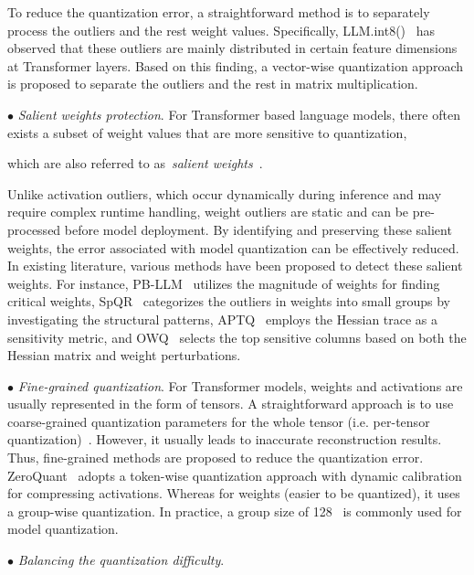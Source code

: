 {To reduce the quantization error, a straightforward method is to separately process the outliers and the rest weight values. Specifically, LLM.int8()~\cite{Dettmers-arxiv-2022-LLM} has observed that these outliers are mainly distributed in certain feature dimensions at Transformer layers. Based on this finding, a vector-wise quantization approach is proposed to separate the outliers and the rest in matrix multiplication. 

$\bullet$ \emph{Salient weights protection}. For Transformer based language models, there often exists a subset of weight values that are more sensitive to quantization, {which are also referred to as~\emph{salient weights}~\cite{Lin-arXiv-2023-AWQ}.

}

{Unlike activation outliers, which occur dynamically during inference and may require complex runtime handling, weight outliers are static and can be pre-processed before model deployment.} By identifying and preserving these salient weights, the error associated with model quantization can be effectively reduced. In existing literature, various methods have been proposed to detect these salient weights. For instance, PB-LLM~\cite{Shang-CORR-2023-PBLLM} utilizes the magnitude of weights for finding critical weights, {SpQR~\cite{Tim-arxiv-2023-SpQR} categorizes the outliers in weights into small groups by investigating the structural patterns,} APTQ~\cite{Guan-CORR-2024-APTQ} employs the Hessian trace as a sensitivity metric, and OWQ~\cite{Lee-AAAI-2024-OWQ} selects the top sensitive columns based on both the Hessian matrix and weight perturbations.

$\bullet$ \emph{Fine-grained quantization}. For Transformer models, weights and activations are usually represented in the form of tensors. A straightforward approach is to use coarse-grained   quantization parameters for the  whole tensor (i.e. per-tensor quantization)~\cite{Xiao-CoRR-2022-SmoothQuant}. However, it usually leads to inaccurate reconstruction results. Thus, fine-grained  methods are proposed to reduce the quantization error. ZeroQuant~\cite{Yao-NeurlPS-2022-ZeroQuant} adopts a  token-wise quantization approach with dynamic calibration for compressing activations. Whereas for weights (easier to be quantized), it uses a group-wise quantization. In practice, a group size of 128~\cite{Yao-NeurlPS-2022-ZeroQuant,Lin-arXiv-2023-AWQ} is commonly used for model quantization.  

$\bullet$ \emph{Balancing the quantization difficulty}.   

}
